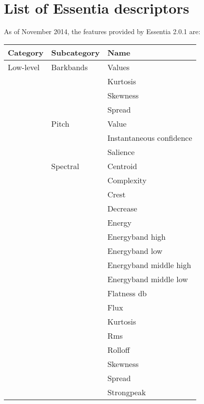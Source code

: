 \chapter{List of Essentia descriptors} 

\label{AppendixA}

As of November 2014, the features provided by Essentia 2.0.1 are:

\begin{center}
\begin{longtable}{ p{} p{} p{} } 

\textbf{Category} & \textbf{Subcategory} & \textbf{Name} \\ \toprule
Low-level & Barkbands & Values\\ \cmidrule(r){3-3}
&  & Kurtosis \\ \cmidrule(r){3-3} 
&  & Skewness \\ \cmidrule(r){3-3}
&  & Spread \\ \cmidrule(r){2-3}
& Pitch & Value\\ \cmidrule(r){3-3}
& & Instantaneous confidence \\ \cmidrule(r){3-3}
& & Salience \\ \cmidrule(r){2-3}
& Spectral & Centroid \\ \cmidrule(r){3-3}
& & Complexity \\ \cmidrule(r){3-3}
& & Crest \\ \cmidrule(r){3-3}
& & Decrease \\ \cmidrule(r){3-3}
& & Energy \\ \cmidrule(r){3-3}
& & Energyband high \\ \cmidrule(r){3-3}
& & Energyband low \\ \cmidrule(r){3-3}
& & Energyband middle high \\ \cmidrule(r){3-3}
& & Energyband middle low \\ \cmidrule(r){3-3}
& & Flatness db \\ \cmidrule(r){3-3}
& & Flux \\ \cmidrule(r){3-3}
& & Kurtosis \\ \cmidrule(r){3-3}
& & Rms \\ \cmidrule(r){3-3}
& & Rolloff \\ \cmidrule(r){3-3}
& & Skewness \\ \cmidrule(r){3-3}
& & Spread \\ \cmidrule(r){3-3}
& & Strongpeak \\ \cmidrule(r){2-3}

\end{longtable}
\end{center}
